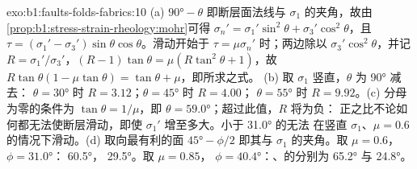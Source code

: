 \begin{solution}{exo:b1:faults-folds-fabrics:10}
(a) $\ang{90} - \theta$ 即断层面法线与 $\sigma_1$ 的夹角，故由
\cref{prop:b1:stress-strain-rheology:mohr}可得
$\sigma_n' = \sigma_1'\sin^2\theta + \sigma_3'\cos^2\theta$，且
$\tau = (\sigma_1' - \sigma_3')\sin\theta\cos\theta$。滑动开始于
$\tau = \mu\sigma_n'$ 时；两边除以 $\sigma_3'\cos^2\theta$，并记
$R = \sigma_1'/\sigma_3'$，$(R - 1)\tan\theta = \mu(R\tan^2\theta + 1)$，故
$R\tan\theta(1 - \mu\tan\theta) = \tan\theta + \mu$，即所求之式。
(b) 取 $\sigma_1$ 竖直，$\theta$ 为 \ang{90} 减去：
$\theta = \ang{30}$ 时 $R = 3.12$；$\theta = \ang{45}$ 时 $R = 4.00$；
$\theta = \ang{55}$ 时 $R = 9.92$。(c) 分母为零的条件为
$\tan\theta = 1/\mu$，即 $\theta = \ang{59.0}$；超过此值，$R$ 将为负：
正之比不论如何都无法使断层滑动，即使
$\sigma_1'$ 增至多大。小于 \ang{31.0} 的无法
在竖直 $\sigma_1$、$\mu = 0.6$ 的情况下滑动。(d) 取向最有利的面
$\ang{45} - \phi/2$ 即其与 $\sigma_1$ 的夹角。取 $\mu = 0.6$，$\phi = \ang{31.0}$：
 \ang{60.5}， \ang{29.5}。取 $\mu = 0.85$，
$\phi = \ang{40.4}$：、的分别为 \ang{65.2} 与 \ang{24.8}。
\end{solution}

